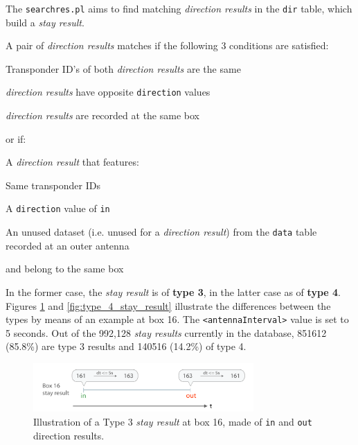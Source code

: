 The \lstinline|searchres.pl| aims to find matching \textit{direction results} in the \lstinline|dir| table, which build a \textit{stay result}.

A pair of \textit{direction results} matches if the following 3 conditions are satisfied:

\begin{mylist}
\item Transponder ID's of both \textit{direction results} are the same
\item \textit{direction results} have opposite \lstinline|direction| values
\item \textit{direction results} are recorded at the same box
\end{mylist}

or if:
\begin{mylist}
\item A \textit{direction result} that features:
    \begin{mylist}
        \item Same transponder IDs
        \item A \lstinline|direction| value of \lstinline|in|
        \item An unused dataset (i.e. unused for a \textit{direction result}) from the \lstinline|data| table recorded at an outer antenna
	\end{mylist}
\item and belong to the same box 
\end{mylist}

In the former case, the \textit{stay result} is of \textbf{type 3}, in the latter case as of \textbf{type 4}. Figures \ref{fig:type_3_stay_result} and \ref{fig:type_4_stay_result} illustrate the differences between the types by means of an example at box 16. The \lstinline|<antennaInterval>| value is set to 5 seconds. Out of the 992,128 \textit{stay results} currently in the database, 851612 (85.8\%) are type 3 results and 140516 (14.2\%) of type 4.


\begin{figure}[htpb]
\begin{center}
  \includegraphics[width=0.75\textwidth]{assets/pdf/stay_result_type_3_schema.pdf}
  \caption[Illustration of a type 3 \textit{stay result}]{Illustration of a Type 3 \textit{stay result} at box 16,  made of \lstinline|in| and \lstinline|out| direction results.}
  \label{fig:type_3_stay_result}
\end{center}
\end{figure}

